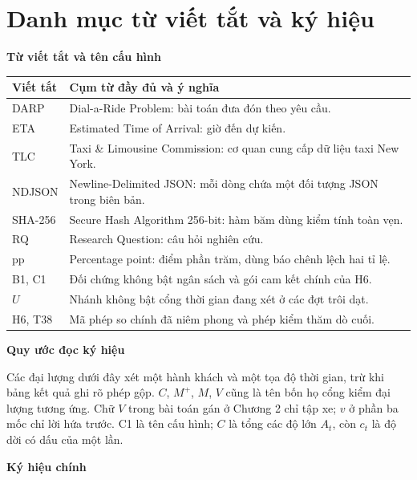 ﻿\chapter*{Danh mục từ viết tắt và ký hiệu}

\noindent\textbf{Từ viết tắt và tên cấu hình}

\begin{longtable}{@{}p{2.4cm}p{12.4cm}@{}}
\toprule
\textbf{Viết tắt} & \textbf{Cụm từ đầy đủ và ý nghĩa}\\
\midrule
\endhead
DARP & Dial-a-Ride Problem: bài toán đưa đón theo yêu cầu.\\
ETA & Estimated Time of Arrival: giờ đến dự kiến.\\
TLC & Taxi \& Limousine Commission: cơ quan cung cấp dữ liệu taxi New York.\\
NDJSON & Newline-Delimited JSON: mỗi dòng chứa một đối tượng JSON trong biên bản.\\
SHA-256 & Secure Hash Algorithm 256-bit: hàm băm dùng kiểm tính toàn vẹn.\\
RQ & Research Question: câu hỏi nghiên cứu.\\
pp & Percentage point: điểm phần trăm, dùng báo chênh lệch hai tỉ lệ.\\
B1, C1 & Đối chứng không bật ngân sách và gói cam kết chính của H6.\\
$U$ & Nhánh không bật cổng thời gian đang xét ở các đợt trôi dạt.\\
H6, T38 & Mã phép so chính đã niêm phong và phép kiểm thăm dò cuối.\\
\bottomrule
\end{longtable}

\noindent\textbf{Quy ước đọc ký hiệu}

Các đại lượng dưới đây xét một hành khách và một tọa độ thời gian, trừ khi bảng kết quả
ghi rõ phép gộp. $C$, $M^{+}$, $M$, $V$ cũng là tên bốn họ cổng kiểm đại lượng tương ứng.
Chữ $V$ trong bài toán gán ở Chương 2 chỉ tập xe; $v$ ở phần ba mốc chỉ lời hứa trước.
C1 là tên cấu hình; $C$ là tổng các độ lớn $A_t$, còn $c_t$ là độ dời có dấu của một lần.

\noindent\textbf{Ký hiệu chính}

